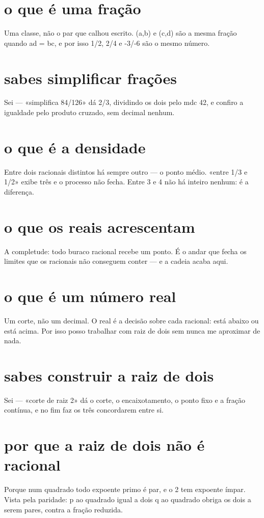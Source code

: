 \documentclass[11pt,a4paper]{article}
\begin{document}
\section{o que é uma fração}
Uma classe, não o par que calhou escrito. (a,b) e (c,d) são a mesma fração quando
ad = bc, e por isso 1/2, 2/4 e -3/-6 são o mesmo número.

\section{sabes simplificar frações}
Sei --- «simplifica 84/126» dá 2/3, dividindo os dois pelo mdc 42, e confiro a
igualdade pelo produto cruzado, sem decimal nenhum.

\section{o que é a densidade}
Entre dois racionais distintos há sempre outro --- o ponto médio. «entre 1/3 e 1/2»
exibe três e o processo não fecha. Entre 3 e 4 não há inteiro nenhum: é a diferença.

\section{o que os reais acrescentam}
A completude: todo buraco racional recebe um ponto. É o andar que fecha os limites que
os racionais não conseguem conter --- e a cadeia acaba aqui.

\section{o que é um número real}
Um corte, não um decimal. O real é a decisão sobre cada racional: está abaixo ou está
acima. Por isso posso trabalhar com raiz de dois sem nunca me aproximar de nada.

\section{sabes construir a raiz de dois}
Sei --- «corte de raiz 2» dá o corte, o encaixotamento, o ponto fixo e a fração
contínua, e no fim faz os três concordarem entre si.

\section{por que a raiz de dois não é racional}
Porque num quadrado todo expoente primo é par, e o 2 tem expoente ímpar. Vista pela
paridade: p ao quadrado igual a dois q ao quadrado obriga os dois a serem pares, contra
a fração reduzida.
\end{document}

